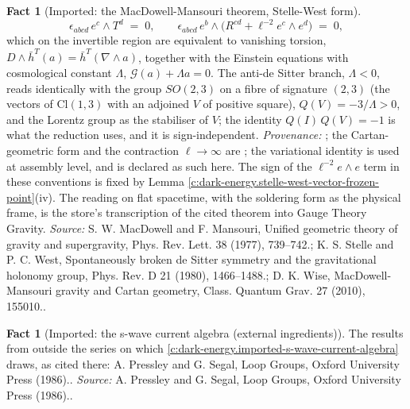 \documentclass[11pt]{article}
\theoremstyle{definition}
\newtheorem{fact}[theorem]{Fact}
\theoremstyle{plain}
\providecommand{\Cl}{}\renewcommand{\Cl}{\mathrm{Cl}}
\providecommand{\hb}{}\renewcommand{\hb}{\bar{h}}
\begin{document}
\begin{fact}[Imported: the MacDowell-Mansouri theorem, Stelle-West form]
\begin{equation}
\epsilon_{abcd}\, e^{c}\wedge T^{d} \;=\; 0, \qquad \epsilon_{abcd}\, e^{b}\wedge\bigl(R^{cd} + \ell^{-2} e^{c}\wedge e^{d}\bigr) \;=\; 0 ,
\end{equation}
which on the invertible region are equivalent to vanishing torsion, $D \wedge \hb^{T}(a) = \hb^{T}(\nabla \wedge a)$, together with the Einstein equations with cosmological constant $\Lambda$, $\mathcal{G}(a) + \Lambda a = 0$. The anti-de Sitter branch, $\Lambda < 0$, reads identically with the group $SO(2,3)$ on a fibre of signature $(2,3)$ (the vectors of $\Cl(1,3)$ with an adjoined $V$ of positive square), $Q(V) = -3/\Lambda > 0$, and the Lorentz group as the stabiliser of $V$; the identity $Q(I)\,Q(V) = -1$ is what the reduction uses, and it is sign-independent. \emph{Provenance:} \cite{MacDowellMansouri1977, StelleWest1980}; the Cartan-geometric form and the contraction $\ell \to \infty$ are \cite{Wise2010}; the variational identity is used at assembly level, and is declared as such here. The sign of the $\ell^{-2}e\wedge e$ term in these conventions is fixed by Lemma \ref{c:dark-energy.stelle-west-vector-frozen-point}(iv). The reading on flat spacetime, with the soldering form as the physical frame, is the store's transcription of the cited theorem into Gauge Theory Gravity.
\emph{Source:} S. W. MacDowell and F. Mansouri, Unified geometric theory of gravity and supergravity, Phys. Rev. Lett. 38 (1977), 739--742.; K. S. Stelle and P. C. West, Spontaneously broken de Sitter symmetry and the gravitational holonomy group, Phys. Rev. D 21 (1980), 1466--1488.; D. K. Wise, MacDowell-Mansouri gravity and Cartan geometry, Class. Quantum Grav. 27 (2010), 155010..
\end{fact}

\begin{fact}[Imported: the s-wave current algebra (external ingredients)]\label{c:dark-energy.imported-s-wave-current-algebra-external}
The results from outside the series on which \ref{c:dark-energy.imported-s-wave-current-algebra} draws, as cited there: A. Pressley and G. Segal, Loop Groups, Oxford University Press (1986)..
\emph{Source:} A. Pressley and G. Segal, Loop Groups, Oxford University Press (1986)..
\end{fact}
\end{document}
